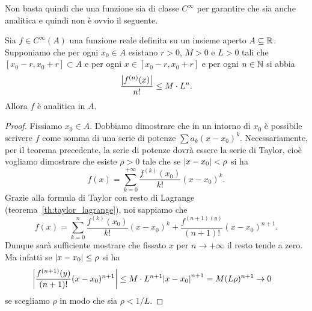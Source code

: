 Non basta quindi che una funzione sia di classe $C^\infty$ per garantire
che sia anche analitica e quindi non è ovvio il seguente.

\begin{theorem}
\label{th:criterio_analitica}
Sia $f\in C^\infty(A)$ una funzione reale definita su un
insieme aperto $A\subseteq \mathbb R$. Supponiamo che per ogni $x_0\in A$ esistano $r>0$,
$M>0$ e $L>0$ tali che $[x_0-r, x_0+r] \subset A$ e
per ogni $x\in [x_0-r, x_0+r]$ e per
ogni $n\in \mathbb N$ si abbia
\[
  \frac{{\left|f^{(n)}(x)\right|}}{n!} \le M\cdot L^n.
\]
Allora $f$ è analitica in $A$.
\end{theorem}
%
\begin{proof}
Fissiamo $x_0\in A$.
Dobbiamo dimostrare che in un intorno di $x_0$ è possibile
scrivere $f$ come somma di una serie di potenze $\sum a_k (x-x_0)^k$.
Necessariamente, per il teorema precedente, la serie
di potenze dovrà essere la serie di Taylor, cioè vogliamo dimostrare che
esiste $\rho>0$ tale che se ${\left|x-x_0\right|}< \rho$ si ha
\[
  f(x) = \sum_{k=0}^{+\infty} \frac{f^{(k)}(x_0)}{k!}(x-x_0)^k.
\]
Grazie alla formula di Taylor con resto di Lagrange (teorema~\ref{th:taylor_lagrange}),
noi sappiamo che
\[
  f(x) = \sum_{k=0}^{n} \frac{f^{(k)}(x_0)}{k!}(x-x_0)^k
   + \frac{f^{(n+1)(y)}}{(n+1)!}(x-x_0)^{n+1}.
\]
Dunque sarà sufficiente mostrare che fissato $x$ per $n\to +\infty$ il resto
tende a zero.
Ma infatti se ${\left|x-x_0\right|}\le \rho$ si ha
\begin{align*}
 {\left|\frac{f^{(n+1)}(y)}{(n+1)!}(x-x_0)^{n+1}\right|}
 & \le  M\cdot L^{n+1}{\left|x-x_0\right|}^{n+1}
 = M (L\rho)^{n+1}\to 0
\end{align*}
se scegliamo $\rho$ in modo che sia $\rho < 1/L$.
\end{proof}

